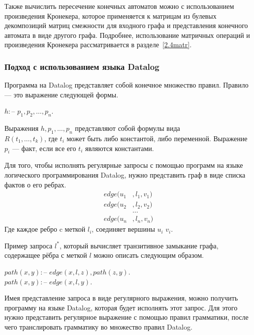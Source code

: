 Также вычислить пересечение конечных автоматов можно с использованием произведения Кронекера, которое применяется к матрицам из булевых декомпозиций матриц смежности для входного графа и представления конечного автомата в виде другого графа. Подробнее, использование матричных операций и произведения Кронекера рассматривается в разделе~\ref{2.4matr}.

\subsubsection{Подход с использованием языка Datalog}

Программа на Datalog представляет собой конечное множество правил. Правило --- это выражение следующей формы.

\begin{center}
    $h :$-- $p_1, p_2, \dots, p_n.$
\end{center}

Выражения $h, p_1, \dots, p_n$ представляют собой формулы вида \\$R(t_1, \dots, t_k)$, где $t_i$ может быть либо константой, либо переменной. Выражение $p_i$ --- факт, если все его $t_i$ являются константами.

    Для того, чтобы исполнять регулярные запросы с помощью программ на языке логического программирования Datalog, нужно представить граф в виде списка фактов о его ребрах.
    \begin{align*}
        edge(u_1 & ,l_1, v_1) \\
        edge(u_2 & ,l_2, v_2) \\
                 & \dots      \\
        edge(u_n & ,l_n, v_n)
    \end{align*}
    Где каждое ребро c меткой $l_i$, соединяет вершины $u_i$ $v_i$.

    Пример запроса $l^*$, который вычисляет транзитивное замыкание графа, содержащее рёбра с меткой $l$ можно описать следующим образом.

    \begin{center}
        $path(x, y) :$-- $edge(x, l, z), path(z, y).$\\
        $path(x, y) :$-- $edge(x, l, y).$
    \end{center}

    Имея представление запроса в виде регулярного выражения, можно получить программу на языке Datalog, которая будет исполнять этот запрос. Для этого нужно представить регулярное выражение с помощью правил грамматики, после чего транслировать грамматику во множество правил Datalog.

